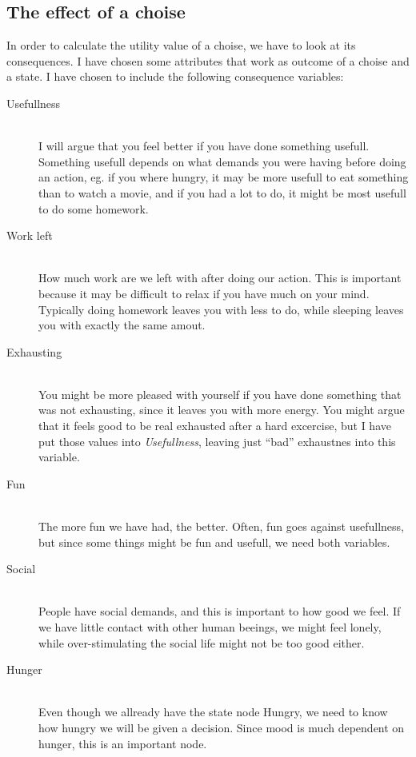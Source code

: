 \subsection{The effect of a choise}
In order to calculate the utility value of a choise, we have to
look at its consequences. I have chosen some attributes that work as outcome of a choise and
a state. I have chosen to include the following consequence variables:
\begin{description}
\item[Usefullness] \hfill\\
I will argue that you feel better if you have done something usefull. Something
usefull depends on what demands you were having before doing an action, eg. if
you where hungry, it may be more usefull to eat something than to watch a movie,
and if you had a lot to do, it might be most usefull to do some homework.

\item[Work left] \hfill\\
How much work are we left with after doing our action. This is important because
it may be difficult to relax if you have much on your mind. Typically doing
homework leaves you with less to do, while sleeping leaves you with exactly the
same amout.

\item[Exhausting] \hfill\\
You might be more pleased with yourself if you have done something that was not
exhausting, since it leaves you with more energy. You might argue that it feels
good to be real exhausted after a hard excercise, but I have put those values
into \emph{Usefullness}, leaving just ``bad'' exhaustnes into this variable.

\item[Fun] \hfill\\
The more fun we have had, the better. Often, fun goes against usefullness, but
since some things might be fun and usefull, we need both variables.

\item[Social] \hfill\\
People have social demands, and this is important to how good we feel. If we
have little contact with other human beeings, we might feel lonely, while
over-stimulating the social life might not be too good either.

\item[Hunger] \hfill\\
Even though we allready have the state node Hungry, we need to know how hungry
we will be given a decision. Since mood is much dependent on hunger, this is an
important node.


\end{description}

